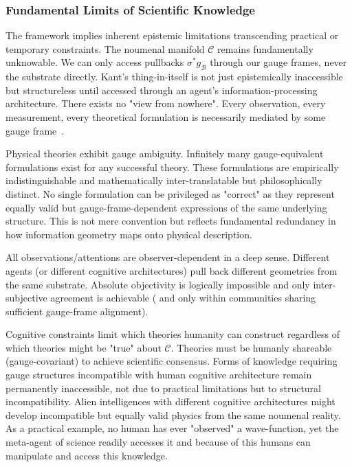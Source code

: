 \documentclass[11pt]{article}
\begin{document}
\subsubsection{Fundamental Limits of Scientific Knowledge}

The framework implies inherent epistemic limitations transcending practical or temporary constraints. The noumenal manifold $\mathcal{C}$ remains fundamentally unknowable. We can only access pullbacks $\sigma^* g_{\mathcal{B}}$ through our gauge frames, never the substrate directly. Kant's thing-in-itself is not just epistemically inaccessible but structureless until accessed through an agent's information-processing architecture. There exists no "view from nowhere".  Every observation, every measurement, every theoretical formulation is necessarily mediated by some gauge frame~\cite{Nagel1986}.

Physical theories exhibit gauge ambiguity.  Infinitely many gauge-equivalent formulations exist for any successful theory. These formulations are empirically indistinguishable and mathematically inter-translatable but philosophically distinct. No single formulation can be privileged as "correct" as they represent equally valid but gauge-frame-dependent expressions of the same underlying structure. This is not mere convention but reflects fundamental redundancy in how information geometry maps onto physical description.

All observations/attentions are observer-dependent in a deep sense. Different agents (or different cognitive architectures) pull back different geometries from the same substrate. Absolute objectivity is logically impossible and only inter-subjective agreement is achievable ( and only within communities sharing sufficient gauge-frame alignment).

Cognitive constraints limit which theories humanity can construct regardless of which theories might be "true" about $\mathcal{C}$. Theories must be humanly shareable (gauge-covariant) to achieve scientific consensus. Forms of knowledge requiring gauge structures incompatible with human cognitive architecture remain permanently inaccessible, not due to practical limitations but to structural incompatibility. Alien intelligences with different cognitive architectures might develop incompatible but equally valid physics from the same noumenal reality.  As a practical example, no human has ever "observed" a wave-function, yet the meta-agent of science readily accesses it and because of this humans can manipulate and access this knowledge.  
\end{document}
